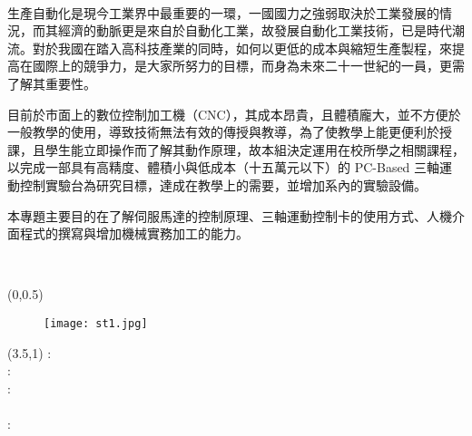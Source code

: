 \documentclass[UTF8]{ctexart}
\newcommand{\twentyfour}{\fontsize{24pt}{\baselineskip}\selectfont}%
\newcommand{\sixteen}{\fontsize{16pt}{\baselineskip}\selectfont}%
\newcommand{\fourteen}{\fontsize{14pt}{\baselineskip}\selectfont}%
\begin{document}
    \newpage
    {\begin{center}
        \bf \kaishu \twentyfour {摘要}\\
    \end{center}}
        \kaishu \sixteen 生產自動化是現今工業界中最重要的一環，一國國力之強弱取決於工業發展的情況，而其經濟的動脈更是來自於自動化工業，故發展自動化工業技術，已是時代潮流。對於我國在踏入高科技產業的同時，如何以更低的成本與縮短生產製程，來提高在國際上的競爭力，是大家所努力的目標，而身為未來二十一世紀的一員，更需了解其重要性。
        
        目前於市面上的數位控制加工機（CNC），其成本昂貴，且體積龐大，並不方便於一般教學的使用，導致技術無法有效的傳授與教導，為了使教學上能更便利於授課，且學生能立即操作而了解其動作原理，故本組決定運用在校所學之相關課程，以完成一部具有高精度、體積小與低成本（十五萬元以下）的 PC-Based 三軸運動控制實驗台為研究目標，達成在教學上的需要，並增加系內的實驗設備。
        
        本專題主要目的在了解伺服馬達的控制原理、三軸運動控制卡的使用方式、人機介面程式的撰寫與增加機械實務加工的能力。
	\newpage
	{\begin{center}
        \bf \kaishu \twentyfour {作者簡介}\\
    \end{center}}
    {\begin{textblock}{6}(0,0.5)
    \begin{figure}
        \texttt{[image: st1.jpg]} %
    \end{figure}
    \end{textblock}}
    {\renewcommand\baselinestretch{0.99}\selectfont %
    {\begin{textblock}{15}(3.5,1) %
    \noindent \kaishu \fourteen {}\enspace:\enspace
    \kaishu \fourteen {}\\ %
    \kaishu \fourteen {}\enspace:\enspace
    \kaishu \fourteen {} \\ %
    \kaishu \fourteen {}\enspace:\enspace
    \kaishu \fourteen {}\\
    \kaishu \fourteen \makebox[5em][s]{\quad}\enspace\enspace
    \kaishu \fourteen {}\\
    \kaishu \fourteen {}\enspace:\enspace
    \end{textblock}}}
    \hspace*{\fill} \\
    
\end{document}
